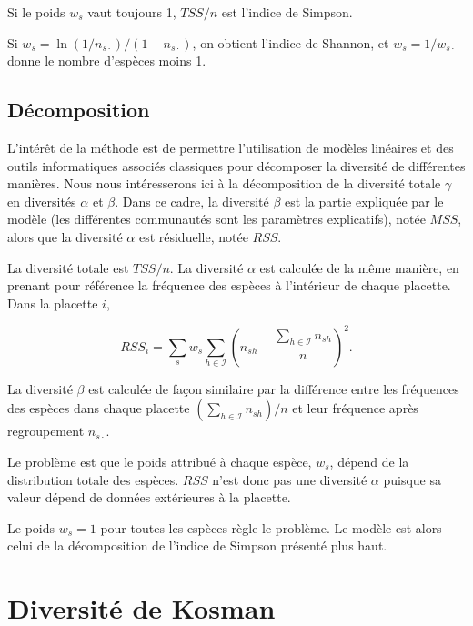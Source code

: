 \documentclass[
  11pt,
  french,
  a4paper,
  extrafontsizes,onecolumn,openright
  ]{memoir}
\begin{document}
Si le poids \(w_s\) vaut toujours 1, \(\mathit{TSS}/{n}\) est l'indice de Simpson.

Si \(w_s={\ln{\left(1/{n_{s\cdot}}\right)}/{\left(1-n_{s\cdot}\right)}}\), on obtient l'indice de Shannon, et \(w_s={1}/{w_{s\cdot}}\) donne le nombre d'espèces moins 1.

\hypertarget{sec:PCdecomposition}{%
\subsection{Décomposition}\label{sec:PCdecomposition}}

L'intérêt de la méthode est de permettre l'utilisation de modèles linéaires et des outils informatiques associés classiques pour décomposer la diversité de différentes manières.
Nous nous intéresserons ici à la décomposition de la diversité totale \(\gamma\) en diversités \(\alpha\) et \(\beta\).
Dans ce cadre, la diversité \(\beta\) est la partie expliquée par le modèle (les différentes communautés sont les paramètres explicatifs), notée \(\mathit{MSS}\), alors que la diversité \(\alpha\) est résiduelle, notée \(\mathit{RSS}\).

La diversité totale est \(\mathit{TSS}/{n}\).
La diversité \(\alpha\) est calculée de la même manière, en prenant pour référence la fréquence des espèces à l'intérieur de chaque placette.
Dans la placette \(i\),

\begin{equation}
  \mathit{RSS}_i = \sum_s{w_s\sum_{h\in {\mathcal I}}{{\left(n_{sh} - \frac{\sum_{h\in {\mathcal I}}{n_{sh}}}{n}\right)}^2}}.
\end{equation}

La diversité \(\beta\) est calculée de façon similaire par la différence entre les fréquences des espèces dans chaque placette \({\left(\sum_{h\in {\mathcal I}}{n_{sh}}\right)}/{n}\) et leur fréquence après regroupement \(n_{s\cdot}\).

Le problème est que le poids attribué à chaque espèce, \(w_s\), dépend de la distribution totale des espèces.
\(\mathit{RSS}\) n'est donc pas une diversité \(\alpha\) puisque sa valeur dépend de données extérieures à la placette.

Le poids \(w_s=1\) pour toutes les espèces règle le problème.
Le modèle est alors celui de la décomposition de l'indice de Simpson présenté plus haut.

\hypertarget{diversituxe9-de-kosman}{%
\section{Diversité de Kosman}\label{diversituxe9-de-kosman}}
\end{document}
